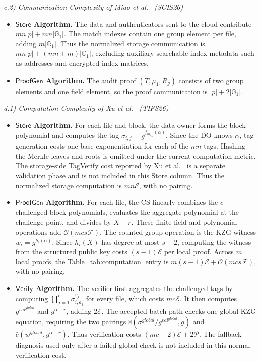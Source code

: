\documentclass[lettersize,journal]{IEEEtran}
\newcommand{\GG}{\mathbb{G}}
\newcommand{\CompExp}{\mathcal{E}}
\newcommand{\CompPair}{\mathcal{P}}
\newcommand{\CompField}{\mathcal{F}}
\newcommand{\Store}{\mathsf{Store}}
\newcommand{\ProofGen}{\mathsf{ProofGen}}
\newcommand{\Verify}{\mathsf{Verify}}
\begin{document}
\noindent\textit{c.2) Communication Complexity of Miao et al.~\cite{MiaoSCIS2026} (SCIS26)}
\begin{itemize}
\item \textbf{$\Store$ Algorithm.}  The data and authenticators sent to the cloud contribute \(mn|p|+mn|\GG_1|\). The match indexes contain one group element per file, adding \(m|\GG_1|\). Thus the normalized storage communication is \(mn|p|+(mn+m)|\GG_1|\), excluding auxiliary searchable index metadata such as addresses and encrypted index matrices.
\item \textbf{$\ProofGen$ Algorithm.}  The audit proof \((T,\mu_1,R_g)\) consists of two group elements and one field element, so the proof communication is \(|p|+2|\GG_1|\).
\end{itemize}

\noindent\textit{d.1) Computation Complexity of Xu et al.~\cite{XuTIFS26} (TIFS26)}
\begin{itemize}
\item \textbf{$\Store$ Algorithm.}  For each file and block, the data owner forms the block polynomial and computes the tag \(\sigma_{i,j}=g^{f_{m_{i,j}}(\alpha)}\). Since the DO knows \(\alpha\), tag generation costs one base exponentiation for each of the \(mn\) tags. Hashing the Merkle leaves and roots is omitted under the current computation metric. The storage-side \textsf{TagVerify} cost reported by Xu et al.~\cite{XuTIFS26} is a separate validation phase and is not included in this Store column. Thus the normalized storage computation is \(mn\CompExp\), with no pairing.
\item \textbf{$\ProofGen$ Algorithm.}  For each file, the CS linearly combines the \(c\) challenged block polynomials, evaluates the aggregate polynomial at the challenge point, and divides by \(X-r\). These finite-field and polynomial operations add \(\mathcal{O}(mcs\CompField)\). The counted group operation is the KZG witness \(w_i=g^{h_i(\alpha)}\). Since \(h_i(X)\) has degree at most \(s-2\), computing the witness from the structured public key costs \((s-1)\CompExp\) per local proof. Across \(m\) local proofs, the Table~\ref{tab:computation} entry is \(m(s-1)\CompExp+\mathcal{O}(mcs\CompField)\), with no pairing.
\item \textbf{$\Verify$ Algorithm.}  The verifier first aggregates the challenged tags by computing \(\prod_{j=1}^{c}\sigma_{i,a_j}^{v_j}\) for every file, which costs \(mc\CompExp\). It then computes \(g^{val^{global}}\) and \(g^{\alpha-r}\), adding \(2\CompExp\). The accepted batch path checks one global KZG equation, requiring the two pairings \(\hat e(\sigma^{global}/g^{val^{global}},g)\) and \(\hat e(w^{global},g^{\alpha-r})\). Thus verification costs \((mc+2)\CompExp+2\CompPair\). The fallback diagnosis used only after a failed global check is not included in this normal verification cost.
\end{itemize}
\end{document}
